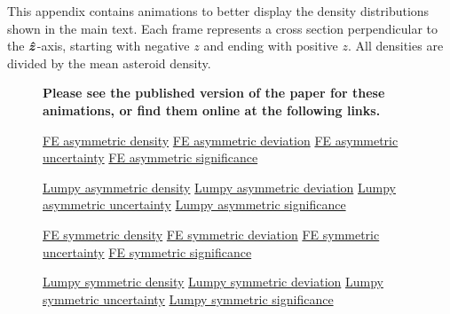 This appendix contains animations to better display the density distributions shown in the main text. Each frame represents a cross section perpendicular to the $\bm{\hat{z}}$-axis, starting with negative $z$ and ending with positive $z$. All densities are divided by the mean asteroid density.

\begin{figure}
  \textbf{Please see the published version of the paper for these animations, or find them online at the following links.}

  \href{https://github.com/jack-dinsmore/asteroid-tidal-torque/tree/main/paper/gifs/asym-fe-d.mp4}{FE asymmetric density} \hfill
  \href{https://github.com/jack-dinsmore/asteroid-tidal-torque/tree/main/paper/gifs/asym-fe-s.mp4}{FE asymmetric deviation} \hfill
  \href{https://github.com/jack-dinsmore/asteroid-tidal-torque/tree/main/paper/gifs/asym-fe-u.mp4}{FE asymmetric uncertainty} \hfill
  \href{https://github.com/jack-dinsmore/asteroid-tidal-torque/tree/main/paper/gifs/asym-fe-r.mp4}{FE asymmetric significance}

  \href{https://github.com/jack-dinsmore/asteroid-tidal-torque/tree/main/paper/gifs/asym-l-d.mp4}{Lumpy asymmetric density} \hfill
  \href{https://github.com/jack-dinsmore/asteroid-tidal-torque/tree/main/paper/gifs/asym-l-s.mp4}{Lumpy asymmetric deviation} \hfill
  \href{https://github.com/jack-dinsmore/asteroid-tidal-torque/tree/main/paper/gifs/asym-l-u.mp4}{Lumpy asymmetric uncertainty} \hfill
  \href{https://github.com/jack-dinsmore/asteroid-tidal-torque/tree/main/paper/gifs/asym-l-r.mp4}{Lumpy asymmetric significance}

  \href{https://github.com/jack-dinsmore/asteroid-tidal-torque/tree/main/paper/gifs/sym-fe-d.mp4}{FE symmetric density} \hfill
  \href{https://github.com/jack-dinsmore/asteroid-tidal-torque/tree/main/paper/gifs/sym-fe-s.mp4}{FE symmetric deviation} \hfill
  \href{https://github.com/jack-dinsmore/asteroid-tidal-torque/tree/main/paper/gifs/sym-fe-u.mp4}{FE symmetric uncertainty} \hfill
  \href{https://github.com/jack-dinsmore/asteroid-tidal-torque/tree/main/paper/gifs/sym-fe-r.mp4}{FE symmetric significance}

  \href{https://github.com/jack-dinsmore/asteroid-tidal-torque/tree/main/paper/gifs/sym-l-d.mp4}{Lumpy symmetric density} \hfill
  \href{https://github.com/jack-dinsmore/asteroid-tidal-torque/tree/main/paper/gifs/sym-l-s.mp4}{Lumpy symmetric deviation} \hfill
  \href{https://github.com/jack-dinsmore/asteroid-tidal-torque/tree/main/paper/gifs/sym-l-u.mp4}{Lumpy symmetric uncertainty} \hfill
  \href{https://github.com/jack-dinsmore/asteroid-tidal-torque/tree/main/paper/gifs/sym-l-r.mp4}{Lumpy symmetric significance}


\end{figure}
